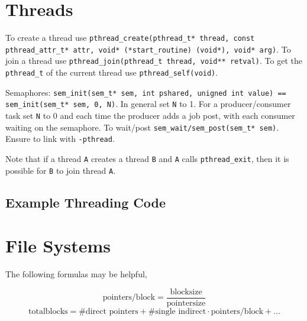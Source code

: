 \documentclass[a4]{article}
\begin{document}
\begin{multicols*}{3}
			
			
		
		
		
		\section{Threads}
		\label{sec:threads}

		To create a thread use \texttt{pthread\_create(pthread\_t* thread, const pthread\_attr\_t* attr, void* (*start\_routine) (void*), void* arg)}. To join a thread use \texttt{pthread\_join(pthread\_t thread, void** retval)}. To get the \texttt{pthread\_t} of the current thread use \texttt{pthread\_self(void)}.

			Semaphores: \texttt{sem\_init(sem\_t* sem, int pshared, unigned int value) == sem\_init(sem\_t* sem, 0, N)}. In general set \texttt N to 1. For a producer/consumer task set \texttt N to 0 and each time the producer adds a job post, with each consumer waiting on the semaphore.  To wait/post \texttt{sem\_wait/sem\_post(sem\_t* sem)}. Ensure to link with \texttt{-pthread}. 

			Note that if a thread \texttt A creates a thread \texttt B and \texttt A calls \texttt{pthread\_exit}, then it is possible for \texttt B to join thread \texttt A.
		
		\subsection{Example Threading Code}
		\label{sub:example_threading_code}
		
			

			

		\section{File Systems}
		\label{sec:file_systems}

			The following formulas may be helpful,
			
			\[ \text{pointers/block} = \frac{\mathrm{blocksize}}{\text{pointersize}}\]
			\[\text{totalblocks} = \text{\# direct pointers} + \text{\# single indirect} \cdot \text{pointers/block} + \ldots \] 


\end{multicols*}
\end{document}
